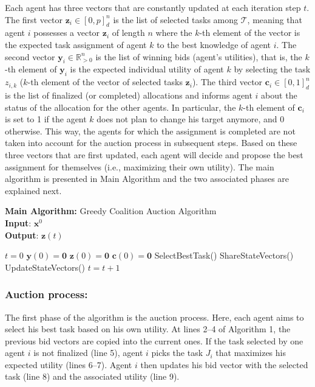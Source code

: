 \documentclass{ifacconf}
\begin{document}
Each agent has three vectors that are constantly updated at each iteration step $t$. The first vector $\bm{z}_i \in [0,p]_d^{n}$ is the list of selected tasks among $\mathcal{T}$, meaning that agent $i$ possesses a vector $\bm{z}_i$ of length $n$ where the $k$-th element of the vector is the expected task assignment of agent $k$ to the best knowledge of agent $i$. The second vector $\bm{y}_i \in \mathbb {R}_{>0}^{n}$ is the list of winning bids (agent's utilities), that is, the $k$-th element of $\bm{y}_i$ is the expected individual utility of agent $k$ by selecting the task $z_{i,k}$ ($k$-th element of the vector of selected tasks $\bm{z}_i$). The third vector $\bm{c}_i \in [0,1]_d^n$ is the list of finalized (or completed) allocations and informs agent $i$ about the status of the allocation for the other agents. In particular, the $k$-th element of $\bm{c}_i$ is set to 1 if the agent $k$ does not plan to change his target anymore, and 0 otherwise. This way, the agents for which the assignment is completed are not taken into account for the auction process in subsequent steps. Based on these three vectors that are first updated, each agent will decide and propose the best assignment for themselves (i.e., maximizing their own utility).
The main algorithm is presented in Main Algorithm and the two associated phases are explained next.

\begin{algorithm}[ht]
\textbf{Main Algorithm:} Greedy Coalition Auction Algorithm\\
\textbf{Input}: $\bm{x}^0$\\
\textbf{Output}: $\bm{z}(t)$
\begin{algorithmic}[1]
\State $t = 0$
\State $\bm{y}(0) = \bm{0}$
\State $\bm{z}(0) = \bm{0}$
\State $\bm{c}(0) = \bm{0}$
  \State SelectBestTask()
  \State ShareStateVectors()
  \State UpdateStateVectors()
  \State $t = t+1$
\EndWhile
\end{algorithmic}
\end{algorithm}

\subsubsection{Auction process:}

The first phase of the algorithm is the auction process.
Here, each agent aims to select his best task based on his own utility.
At lines 2--4 of Algorithm 1, the previous bid vectors are copied into the current ones. If the task selected by one agent $i$ is not finalized (line 5), agent $i$ picks the task $J_i$ that maximizes his expected utility (lines 6--7). Agent $i$ then updates his bid vector with the selected task (line 8) and the associated utility (line 9).
\end{document}

